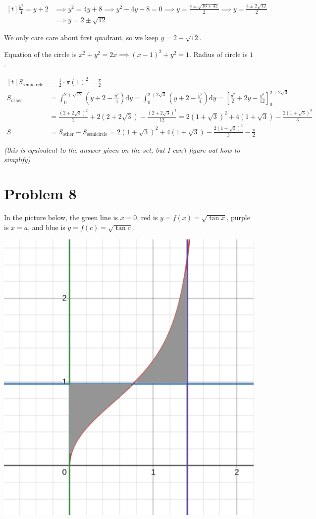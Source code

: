 \documentclass[preview, margin=0.6in]{standalone}
\newcommand*{\problem}[1]{\section*{Problem #1}}
\begin{document}
$\begin{aligned}[t]
    \frac{y^2}{4}=y+2
	&\implies y^2=4y+8
	\implies y^2-4y-8=0
	\implies y=\frac{4\pm \sqrt{16+32}}{2}
	\implies y=\frac{4\pm 2 \sqrt{12}}{2} \\
	&\implies y=2\pm \sqrt{12}
\end{aligned}$

We only care care about first quadrant, so we keep $y=2+\sqrt{12}$.

Equation of the circle is $x^2+y^2=2x\implies (x-1)^2+y^2=1$. Radius of circle is $1$.

$\begin{aligned}[t]
	S_{\text{semicircle}}&=\frac12\cdot\pi(1)^2=\frac{\pi}{2} \\
	S_{\text{other}}&=\int_{0}^{2+\sqrt{12}}\left(y+2-\frac{y^2}{4}\right)\mathrm{d}y
	=\int_{0}^{2+2 \sqrt{3}}\left(y+2-\frac{y^2}{4}\right)\mathrm{d}y
	=\left[\frac{y^2}{2}+2y-\frac{y^3}{12}\right]_{0}^{2+2 \sqrt{3}} \\
	&=\frac{\left(2+2 \sqrt{3}\right)^2}{2}+2\left(2+2 \sqrt{3}\right)-\frac{\left(2+2 \sqrt{3}\right)^3}{12}
	=2\left(1+\sqrt{3}\right)^2+4\left(1+\sqrt{3}\right)-\frac{2\left(1+\sqrt{3}\right)^3}{3} \\
	S&=S_{\text{other}}-S_{\text{semicircle}}=\boxed{2\left(1+\sqrt{3}\right)^2+4\left(1+\sqrt{3}\right)-\frac{2\left(1+\sqrt{3}\right)^3}{3}-\frac{\pi}{2}}
\end{aligned}$

\textit{(this is equivalent to the answer given on the set, but I can't figure out how to simplify)}

\problem{8}
In the picture below, the green line is $x=0$, red is $y=f(x)=\sqrt{\tan x}$, purple is $x=a$, and blue is $y=f(c)=\sqrt{\tan c}$.

\begin{center}
	\includegraphics[width=0.5\linewidth]{q8.png}
\end{center}
\end{document}
